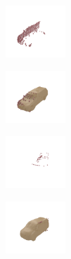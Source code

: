 \begin{figure}[t]
    \vspace*{-16px}
    \vspace*{-\figskipabove px}
    \centering
    {\scriptsize
    \begin{subfigure}[t]{0.235\textwidth}
        \begin{subfigure}[t]{0.49\textwidth}
            \vspace{0px}\centering
            \includegraphics[width=2.25cm,trim={3cm 3cm 3cm 3cm},clip]{gfx_intro_shapenet_165_points}
        \end{subfigure}
        \begin{subfigure}[t]{0.49\textwidth}
            \vspace{0px}\centering
            \includegraphics[width=2.25cm,trim={3cm 3cm 3cm 3cm},clip]{gfx_intro_shapenet_results_165}
        \end{subfigure}
        \vspace*{-2px}
    \end{subfigure}
    \begin{subfigure}[t]{0.235\textwidth}
        \begin{subfigure}[t]{0.49\textwidth}
            \vspace{0px}\centering
            \includegraphics[width=2.25cm,trim={3cm 3cm 3cm 3cm},clip]{gfx_intro_kitti_1224_points}
        \end{subfigure}
        \begin{subfigure}[t]{0.49\textwidth}
            \vspace{0px}\centering
            \includegraphics[width=2.25cm,trim={3cm 3cm 3cm 3cm},clip]{gfx_intro_kitti_results_1224}

\end{subfigure}
\end{subfigure}}
\end{figure}
